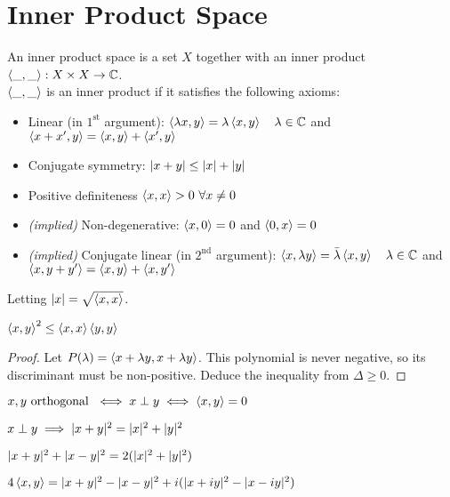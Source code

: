 \section{Inner Product Space}
An inner product space is a set $X$ together with an inner product $\left\langle \_,\_ \right\rangle: X \times X \to \mathbb{C}$.\\
$\left\langle \_,\_ \right\rangle$ is an inner product if it satisfies the following axioms:
\begin{itemize}
	\item Linear (in $1^{\text{st}}$ argument): $\left\langle \lambda x,y \right\rangle = \lambda \left\langle x,y \right\rangle \quad \lambda \in \mathbb{C}$ and $\left\langle x+x',y \right\rangle = \left\langle x,y \right\rangle +\left\langle x',y \right\rangle$
	\item Conjugate symmetry: $| x+y | \leq | x | + | y |$
	\item Positive definiteness $\left\langle x,x \right\rangle>0 \ \forall x \neq 0$
	\item \textit{(implied)} Non-degenerative: $\left\langle x,0 \right\rangle=0$ and $\left\langle 0,x \right\rangle=0$
	\item \textit{(implied)} Conjugate linear (in $2^{\text{nd}}$ argument): $\left\langle x,\lambda y \right\rangle = \bar{\lambda} \left\langle x,y \right\rangle \quad \lambda \in \mathbb{C}$ and $\left\langle x,y+y' \right\rangle = \left\langle x,y \right\rangle +\left\langle x,y' \right\rangle$
\end{itemize}
\begin{property}
	Letting $| x | = \sqrt{\left\langle x,x \right\rangle}$.
\end{property}

\begin{property}
	$\left\langle x,y \right\rangle^2 \leq \left\langle x,x \right\rangle \left\langle y,y \right\rangle$
\end{property}
\begin{proof}
	Let $P(\lambda)=\left\langle x+\lambda y,x+\lambda y \right\rangle$.
	This polynomial is never negative, so its discriminant must be non-positive.
	Deduce the inequality from $\Delta \geq 0$.
\end{proof}
\begin{definition}
	$x,y \text{ orthogonal } \iff x \perp y \iff \left\langle x,y \right\rangle=0$
\end{definition}
\begin{property}
	$x \perp y \implies | x+y |^2 = | x |^2 + | y |^2$
\end{property}
\begin{property}
	$| x+y |^2 +| x-y |^2 = 2 (| x |^2 + | y |^2)$
\end{property}
\begin{property}
	$4 \left\langle x,y \right\rangle = | x+y |^2 - | x-y |^2 + i(| x+iy |^2 - | x-iy |^2)$
\end{property}

